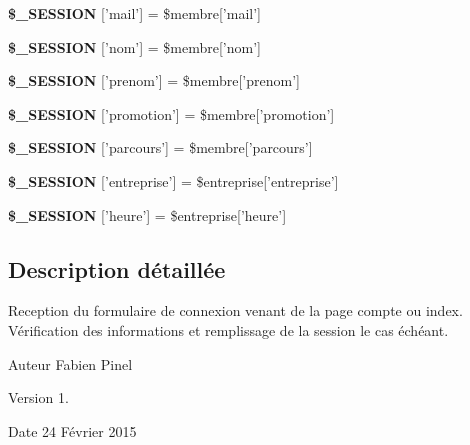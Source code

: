 \begin{DoxyCompactItemize}
\item 
\hypertarget{connexion_8php_afb530a60b1bccbc57206a33730fc8005}{{\bfseries \$\-\_\-\-S\-E\-S\-S\-I\-O\-N} \mbox{[}'mail'\mbox{]} = \$membre\mbox{[}'mail'\mbox{]}}\label{connexion_8php_afb530a60b1bccbc57206a33730fc8005}

\item 
\hypertarget{connexion_8php_a06fa3ed0b0b20f341aaffdd11d778856}{{\bfseries \$\-\_\-\-S\-E\-S\-S\-I\-O\-N} \mbox{[}'nom'\mbox{]} = \$membre\mbox{[}'nom'\mbox{]}}\label{connexion_8php_a06fa3ed0b0b20f341aaffdd11d778856}

\item 
\hypertarget{connexion_8php_af786fa4cdfc30fe2f84ae5c536ac9dd4}{{\bfseries \$\-\_\-\-S\-E\-S\-S\-I\-O\-N} \mbox{[}'prenom'\mbox{]} = \$membre\mbox{[}'prenom'\mbox{]}}\label{connexion_8php_af786fa4cdfc30fe2f84ae5c536ac9dd4}

\item 
\hypertarget{connexion_8php_a25249d2d49dea117dda9476cc15daafc}{{\bfseries \$\-\_\-\-S\-E\-S\-S\-I\-O\-N} \mbox{[}'promotion'\mbox{]} = \$membre\mbox{[}'promotion'\mbox{]}}\label{connexion_8php_a25249d2d49dea117dda9476cc15daafc}

\item 
\hypertarget{connexion_8php_a9c900cc96004a880a8c7fc296dce7f48}{{\bfseries \$\-\_\-\-S\-E\-S\-S\-I\-O\-N} \mbox{[}'parcours'\mbox{]} = \$membre\mbox{[}'parcours'\mbox{]}}\label{connexion_8php_a9c900cc96004a880a8c7fc296dce7f48}

\item 
\hypertarget{connexion_8php_a3bedf210a47aa6ad6d2a7113f8937ba6}{{\bfseries \$\-\_\-\-S\-E\-S\-S\-I\-O\-N} \mbox{[}'entreprise'\mbox{]} = \$entreprise\mbox{[}'entreprise'\mbox{]}}\label{connexion_8php_a3bedf210a47aa6ad6d2a7113f8937ba6}

\item 
\hypertarget{connexion_8php_a7025258b2f2387d0205ca08d0e512ec6}{{\bfseries \$\-\_\-\-S\-E\-S\-S\-I\-O\-N} \mbox{[}'heure'\mbox{]} = \$entreprise\mbox{[}'heure'\mbox{]}}\label{connexion_8php_a7025258b2f2387d0205ca08d0e512ec6}

\end{DoxyCompactItemize}


\subsection{Description détaillée}
Reception du formulaire de connexion venant de la page compte ou index. Vérification des informations et remplissage de la session le cas échéant. \begin{DoxyAuthor}{Auteur}
Fabien Pinel 
\end{DoxyAuthor}
\begin{DoxyVersion}{Version}
1. 
\end{DoxyVersion}
\begin{DoxyDate}{Date}
24 Février 2015 
\end{DoxyDate}


